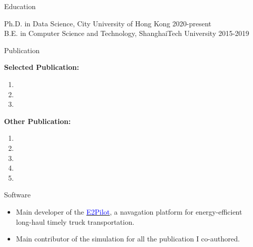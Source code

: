 \documentclass{resume} %
\begin{document}


\begin{rSection}{Education}

{Ph.D. in Data Science}, City University of Hong Kong  \hfill {2020-present}\\
{B.E. in Computer Science and Technology}, ShanghaiTech University \hfill {2015-2019}

\end{rSection}

\begin{rSection}{Publication}
    
    \textbf{Selected Publication:}
    \begin{enumerate}
        \item {}
        \item {}
        \item {}
    \end{enumerate}
    \textbf{Other Publication:}
    \begin{enumerate}
        \item {}
        \item {}
        \item {}
        \item {}
        \item {}
    \end{enumerate}
\end{rSection}

\begin{rSection}{Software}
    \begin{itemize}
        \item Main developer of the \href{https://www.e2pilots.com/}{\textcolor{blue}{E2Pilot}}, a navagation platform for energy-efficient long-haul timely truck transportation.
        \item Main contributor of the simulation for all the publication I co-authored.
    \end{itemize}
\end{rSection}
\end{document}
